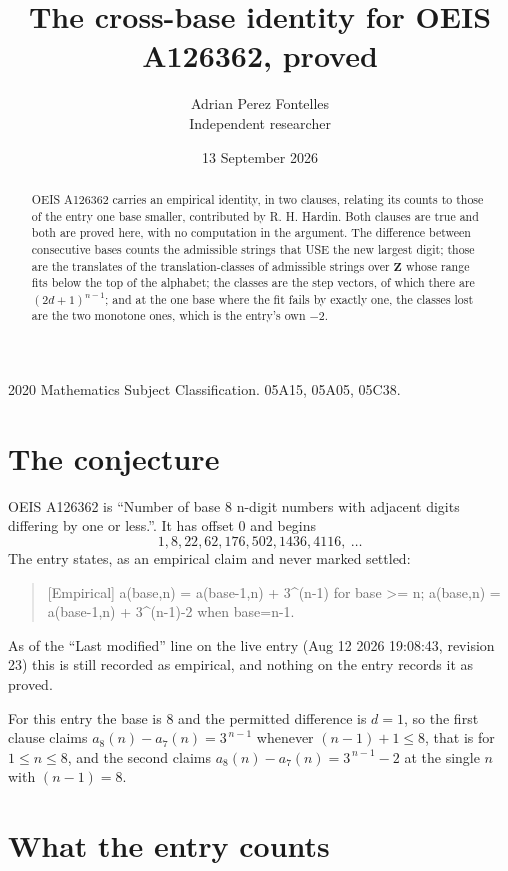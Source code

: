 \documentclass[11pt,a4paper]{article}
\title{The cross-base identity for OEIS A126362, proved}
\author{Adrian Perez Fontelles\\ \small Independent researcher}
\date{13 September 2026}
\theoremstyle{plain}
\theoremstyle{definition}
\begin{document}
\maketitle

\begin{abstract}
OEIS A126362 carries an empirical identity, in two clauses, relating its counts to those of the
entry one base smaller, contributed by R. H. Hardin. Both clauses are true and both are proved
here, with no computation in the argument. The difference between consecutive bases counts the
admissible strings that USE the new largest digit; those are the translates of the
translation-classes of admissible strings over $\mathbf{Z}$ whose range fits below the top of
the alphabet; the classes are the step vectors, of which there are $(2d+1)^{n-1}$; and at the
one base where the fit fails by exactly one, the classes lost are the two monotone ones, which
is the entry's own $-2$.
\end{abstract}

\noindent\small 2020 Mathematics Subject Classification. 05A15, 05A05, 05C38.\normalsize

\section{The conjecture}

OEIS A126362 is ``Number of base 8 n-digit numbers with adjacent digits differing by one or less.''. It has offset $0$ and begins
\[
1, 8, 22, 62, 176, 502, 1436, 4116,\ \dots
\]
The entry states, as an empirical claim and never marked settled:
\begin{quote}
[Empirical] a(base,n) = a(base-1,n) + 3\textasciicircum{}(n-1) for base >= n; a(base,n) = a(base-1,n) + 3\textasciicircum{}(n-1)-2 when base=n-1.
\end{quote}
As of the ``Last modified'' line on the live entry (Aug 12 2026 19:08:43, revision 23)
this is still recorded as empirical, and nothing on the entry records it as proved.

For this entry the base is $8$ and the permitted difference is $d=1$, so the first clause
claims $a_{8}(n)-a_{7}(n)=3^{\,n-1}$ whenever $(n-1)+1\le8$, that is for
$1\le n\le8$, and the second claims $a_{8}(n)-a_{7}(n)=3^{\,n-1}-2$ at the single
$n$ with $(n-1)=8$.

\section{What the entry counts}
\end{document}
